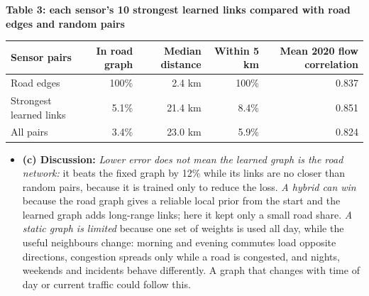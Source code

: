 \vspace{4pt}\noindent\begin{minipage}{\textwidth}
\centering\footnotesize
\textbf{Table 3: each sensor's 10 strongest learned links compared with road edges and random pairs}\\[2pt]
\begin{tabular}{@{}lrrrr@{}}
\toprule
Sensor pairs & In road graph & Median distance & Within 5 km & Mean 2020 flow correlation \\
\midrule
Road edges & 100\% & 2.4 km & 100\% & 0.837 \\
Strongest learned links & 5.1\% & 21.4 km & 8.4\% & 0.851 \\
All pairs & 3.4\% & 23.0 km & 5.9\% & 0.824 \\
\bottomrule
\end{tabular}
\end{minipage}
\vspace{4pt}

\begin{itemize}
    \item \textbf{(c) Discussion:} \emph{Lower error does not mean the learned graph is the road network:} it beats the fixed graph by 12\% while its links are no closer than random pairs, because it is trained only to reduce the loss. \emph{A hybrid can win} because the road graph gives a reliable local prior from the start and the learned graph adds long-range links; here it kept only a small road share. \emph{A static graph is limited} because one set of weights is used all day, while the useful neighbours change: morning and evening commutes load opposite directions, congestion spreads only while a road is congested, and nights, weekends and incidents behave differently. A graph that changes with time of day or current traffic could follow this.
\end{itemize}
